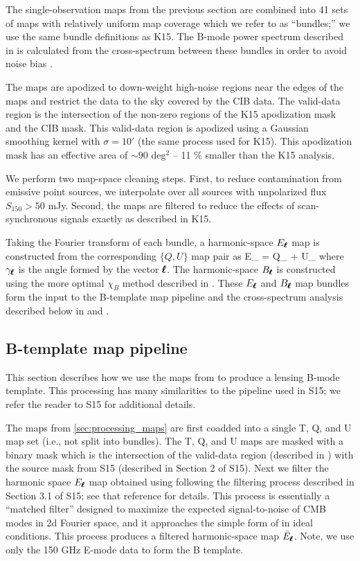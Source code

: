 The single-observation maps from the previous section are combined into 41 sets of maps with relatively uniform map coverage which we refer to as ``bundles;'' we use the same bundle definitions as K15.
The B-mode power spectrum described in  is calculated from the cross-spectrum between these bundles in order to avoid noise bias \citep{polenta05,tristram05}.

The maps are apodized to down-weight high-noise regions near the edges of the maps and restrict the data to the sky covered by the CIB data.
The valid-data region is the intersection of the non-zero regions of the K15 apodization mask and the CIB mask.
This valid-data region is apodized using a Gaussian smoothing kernel with $\sigma = 10'$ (the same process used for K15).
This apodization mask has an effective area of $\sim 90$ deg$^2$ -- 11 \% smaller than the K15 analysis.

We perform two map-space cleaning steps.
First, to reduce contamination from emissive point sources, we interpolate over all sources with unpolarized flux $S_{150}>50$ mJy.
Second, the maps are filtered to reduce the effects of scan-synchronous signals exactly as described in K15.

Taking the Fourier transform of each bundle, a harmonic-space $E_{\pmb{\ell}}$ map is constructed from the corresponding $\{Q,U\}$ map pair as
\beq \label{eqn:Edeco}
E_{\bl} = Q_{\bl} \cos{2\gamma_{\bl}} + U_{\bl} \sin{2\gamma_{\bl}}
\eeq
where $\gamma_{\pmb{\ell}}$ is the angle formed by the vector $\pmb{\ell}$.
The harmonic-space $B_{\pmb{\ell}}$ is constructed using the more optimal $\chi_B$ method described in \cite{smith07b}.
These $E_{\pmb{\ell}}$ and $B_{\pmb{\ell}}$ map bundles form the input to the B-template map pipeline and the cross-spectrum analysis described below in  and .


\subsection{B-template map pipeline}
\label{sec:btemplate}
This section describes how we use the maps from  to produce a lensing B-mode template.
This processing has many similarities to the pipeline used in S15; we refer the reader to S15 for additional details.

The maps from \ref{sec:processing_maps} are first coadded into a single T, Q, and U map set (i.e., not split into bundles).
The T, Q, and U maps are masked with a binary mask which is the intersection of the valid-data region (described in ) with the source mask from S15 (described in Section 2 of S15).
Next we filter the harmonic space $E_{\pmb{\ell}}$ map obtained using  following the filtering process described in Section 3.1 of S15; see that reference for details.
This process is essentially a ``matched filter'' designed to maximize the expected signal-to-noise of CMB modes in 2d Fourier space,
and it approaches the simple form of  in ideal conditions.
This process produces a filtered harmonic-space map $\bar{E}_{\pmb{\ell}}$.
Note, we use only the 150 GHz E-mode data to form the B template.

